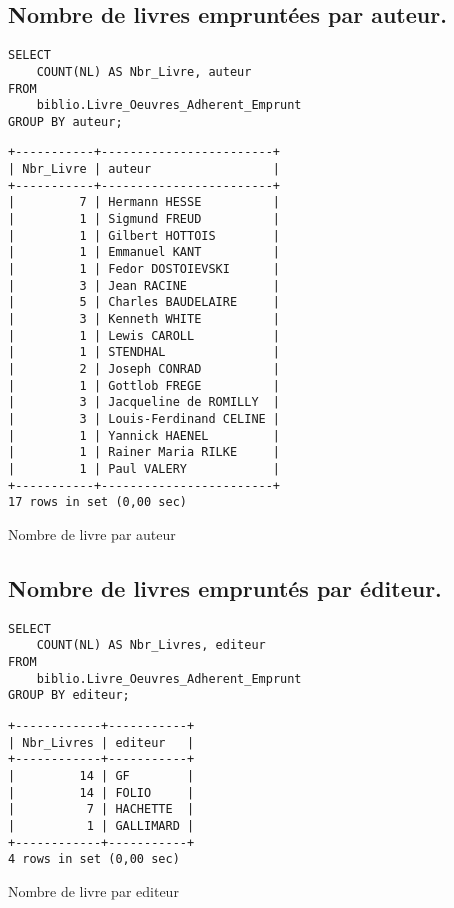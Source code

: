\documentclass{article}
\begin{document}
\subsection{Nombre de livres empruntées par auteur.}
\begin{center}
\begin{minipage}{0.5\linewidth}
\begin{listing}[H]
\begin{verbatim}
SELECT 
    COUNT(NL) AS Nbr_Livre, auteur
FROM
    biblio.Livre_Oeuvres_Adherent_Emprunt
GROUP BY auteur;
\end{verbatim}
\begin{verbatim}
+-----------+------------------------+
| Nbr_Livre | auteur                 |
+-----------+------------------------+
|         7 | Hermann HESSE          |
|         1 | Sigmund FREUD          |
|         1 | Gilbert HOTTOIS        |
|         1 | Emmanuel KANT          |
|         1 | Fedor DOSTOIEVSKI      |
|         3 | Jean RACINE            |
|         5 | Charles BAUDELAIRE     |
|         3 | Kenneth WHITE          |
|         1 | Lewis CAROLL           |
|         1 | STENDHAL               |
|         2 | Joseph CONRAD          |
|         1 | Gottlob FREGE          |
|         3 | Jacqueline de ROMILLY  |
|         3 | Louis-Ferdinand CELINE |
|         1 | Yannick HAENEL         |
|         1 | Rainer Maria RILKE     |
|         1 | Paul VALERY            |
+-----------+------------------------+
17 rows in set (0,00 sec)	
\end{verbatim}
\caption{Nombre de livre par auteur}
\end{listing}
\end{minipage}
\end{center}
\subsection{Nombre de livres empruntés par éditeur.}
\begin{center}
	\begin{minipage}{0.5\linewidth}
\begin{listing}[H]
\begin{verbatim}
SELECT 
    COUNT(NL) AS Nbr_Livres, editeur
FROM
    biblio.Livre_Oeuvres_Adherent_Emprunt
GROUP BY editeur;
\end{verbatim}
\begin{verbatim}
+------------+-----------+
| Nbr_Livres | editeur   |
+------------+-----------+
|         14 | GF        |
|         14 | FOLIO     |
|          7 | HACHETTE  |
|          1 | GALLIMARD |
+------------+-----------+
4 rows in set (0,00 sec)
\end{verbatim}
\caption{Nombre de livre par editeur}
\end{listing}
\end{minipage}
\end{center}
\end{document}
